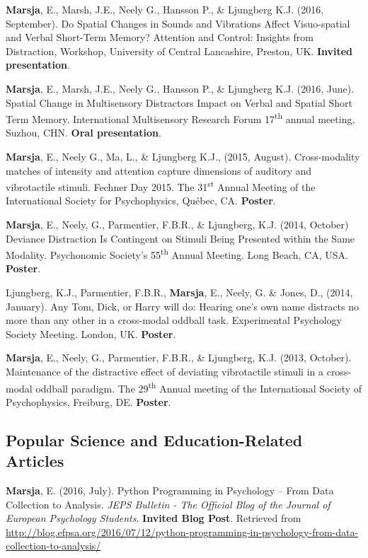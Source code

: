 \documentclass[]{article}
\begin{document}
\textbf{Marsja}, E., Marsh, J.E., Neely G., Hansson P., \& Ljungberg
K.J. (2016, September). Do Spatial Changes in Sounds and Vibrations
Affect Visuo-spatial and Verbal Short-Term Memory? Attention and
Control: Insights from Distraction, Workshop, University of Central
Lancashire, Preston, UK. \textbf{Invited presentation}.

\textbf{Marsja}, E., Marsh, J.E., Neely G., Hansson P., \& Ljungberg
K.J. (2016, June). Spatial Change in Multisensory Distractors Impact on
Verbal and Spatial Short Term Memory. International Multisensory
Research Forum 17\textsuperscript{th} annual meeting, Suzhou, CHN.
\textbf{Oral presentation}.

\textbf{Marsja}, E., Neely G., Ma, L., \& Ljungberg K.J., (2015,
August). Cross-modality matches of intensity and attention capture
dimensions of auditory and vibrotactile stimuli. Fechner Day 2015. The
31\textsuperscript{st} Annual Meeting of the International Society for
Psychophysics, Québec, CA. \textbf{Poster}.

\textbf{Marsja}, E., Neely, G., Parmentier, F.B.R., \& Ljungberg, K.J.
(2014, October) Deviance Distraction Is Contingent on Stimuli Being
Presented within the Same Modality. Psychonomic Society's
55\textsuperscript{th} Annual Meeting. Long Beach, CA, USA.
\textbf{Poster}.

Ljungberg, K.J., Parmentier, F.B.R., \textbf{Marsja}, E., Neely, G. \&
Jones, D., (2014, January). Any Tom, Dick, or Harry will do: Hearing
one's own name distracts no more than any other in a cross-modal oddball
task. Experimental Psychology Society Meeting. London, UK.
\textbf{Poster}.

\textbf{Marsja}, E., Neely, G., Parmentier, F.B.R., \& Ljungberg, K.J.
(2013, October). Maintenance of the distractive effect of deviating
vibrotactile stimuli in a cross-modal oddball paradigm. The
29\textsuperscript{th} Annual meeting of the International Society of
Psychophysics, Freiburg, DE. \textbf{Poster}.

\hypertarget{popular-science-and-education-related-articles}{%
\subsection{Popular Science and Education-Related
Articles}\label{popular-science-and-education-related-articles}}

\textbf{Marsja}, E. (2016, July). Python Programming in Psychology --
From Data Collection to Analysis. \emph{JEPS Bulletin - The Official
Blog of the Journal of European Psychology Students}. \textbf{Invited
Blog Post}. Retrieved from \sloppy
\url{http://blog.efpsa.org/2016/07/12/python-programming-in-psychology-from-data-collection-to-analysis/}
\end{document}
